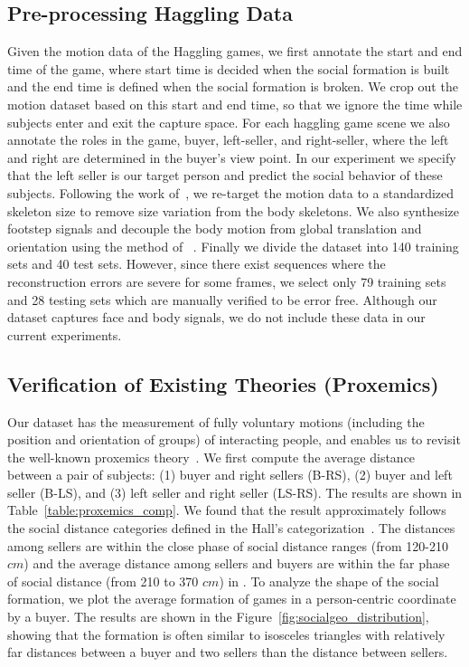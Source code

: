 \subsection{Pre-processing Haggling Data}
Given the motion data of the Haggling games, we first annotate the start and end time of the game, where start time is decided when the social formation is built and the end time is defined when the social formation is broken. We crop out the motion dataset based on this start and end time, so that we ignore the time while subjects enter and exit the capture space. For each haggling game scene we also annotate the roles in the game, buyer, left-seller, and right-seller, where the left and right are determined in the buyer's view point. In our experiment we specify that the left seller is our target person and predict the social behavior of these subjects. Following the work of~\cite{holden2016deep}, we re-target the motion data to a standardized skeleton size to remove size variation from the body skeletons. We also synthesize footstep signals and decouple the body motion from global translation and orientation using the method of ~\cite{holden2016deep}. Finally we divide the dataset into 140 training sets and 40 test sets. However, since there exist sequences where the reconstruction errors are severe for some frames, we select only 79 training sets and 28 testing sets which are manually verified to be error free. Although our dataset captures face and body signals, we do not include these data in our current experiments. 


\subsection{Verification of Existing Theories (Proxemics)}
Our dataset has the measurement of fully voluntary motions (including the position and orientation of groups) of interacting people, and enables us to revisit the well-known proxemics theory~\cite{Hall66}. We first compute the average distance between a pair of subjects: (1) buyer and right sellers (B-RS), (2) buyer and left seller (B-LS), and (3) left seller and right seller (LS-RS). The results are shown in Table~\ref{table:proxemics_comp}. We found that the result approximately follows the social distance categories defined in the Hall's categorization~\cite{Hall66}. The distances among sellers are within the close phase of social distance ranges (from 120-210 $cm$) and the average distance among sellers and buyers are within the far phase of social distance (from 210 to 370 $cm$) in \cite{Hall66}. To analyze the shape of the social formation, we plot the average formation of games in a person-centric coordinate by a buyer. The results are shown in the Figure~\ref{fig:socialgeo_distribution}, showing that the formation is often similar to isosceles triangles with relatively far distances between a buyer and two sellers than the distance between sellers. 


